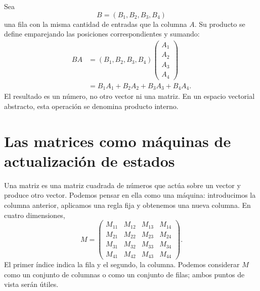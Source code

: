 Sea
\begin{equation}
  B=(B_1,B_2,B_3,B_4)
\end{equation}
una fila con la misma cantidad de entradas que la columna \(A\). Su producto se define emparejando las posiciones correspondientes y sumando:
\begin{align}
  BA
  &=
  (B_1,B_2,B_3,B_4)
  \begin{pmatrix}
    A_1\\ A_2\\ A_3\\ A_4
  \end{pmatrix}\\
  &=B_1A_1+B_2A_2+B_3A_3+B_4A_4.
  \label{eq:l01-inner-product}
\end{align}
El resultado es un número, no otro vector ni una matriz. En un espacio vectorial abstracto, esta operación se denomina producto interno.

\begin{classroomqa}
\end{classroomqa}

\section{Las matrices como máquinas de actualización de estados}

Una matriz es una matriz cuadrada de números que actúa sobre un vector y produce otro vector. Podemos pensar en ella como una máquina: introducimos la columna anterior, aplicamos una regla fija y obtenemos una nueva columna. En cuatro dimensiones,
\begin{equation}
  M=
  \begin{pmatrix}
    M_{11}&M_{12}&M_{13}&M_{14}\\
    M_{21}&M_{22}&M_{23}&M_{24}\\
    M_{31}&M_{32}&M_{33}&M_{34}\\
    M_{41}&M_{42}&M_{43}&M_{44}
  \end{pmatrix}.
  \label{eq:l01-general-matrix}
\end{equation}
El primer índice indica la fila y el segundo, la columna. Podemos considerar \(M\) como un conjunto de columnas o como un conjunto de filas; ambos puntos de vista serán útiles.

